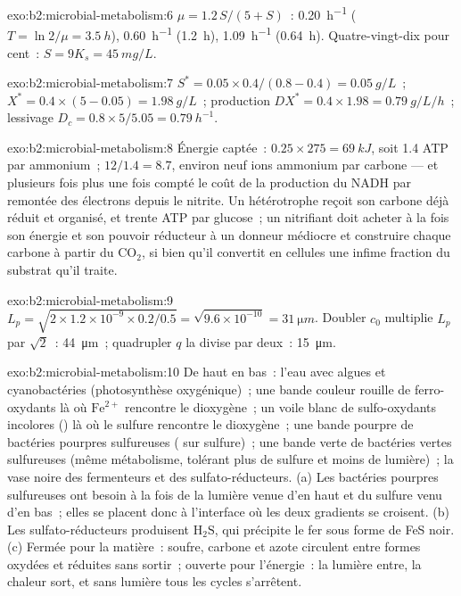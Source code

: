 \begin{solution}{exo:b2:microbial-metabolism:6}
$\mu = 1.2\,S/(5 + S)$~: \qty{0.20}{h^{-1}} ($T = \ln 2/\mu =
\qty{3.5}{h}$), \qty{0.60}{h^{-1}} (\qty{1.2}{h}), \qty{1.09}{h^{-1}}
(\qty{0.64}{h}). Quatre-vingt-dix pour cent~: $S = 9K_s = \qty{45}{mg/L}$.
\end{solution}

\begin{solution}{exo:b2:microbial-metabolism:7}
$S^* = 0.05\times 0.4/(0.8 - 0.4) = \qty{0.05}{g/L}$~; $X^* =
0.4\times(5 - 0.05) = \qty{1.98}{g/L}$~; production $DX^* = 0.4\times
1.98 = \qty{0.79}{g/L/h}$~; lessivage $D_c = 0.8\times 5/5.05 =
\qty{0.79}{h^{-1}}$.
\end{solution}

\begin{solution}{exo:b2:microbial-metabolism:8}
Énergie captée~: $0.25\times 275 = \qty{69}{kJ}$, soit 1.4 ATP par
ammonium~; $12/1.4 = 8.7$, environ neuf ions ammonium par carbone ---
et plusieurs fois plus une fois compté le coût de la production du NADH
par remontée des électrons depuis le nitrite. Un hétérotrophe reçoit son
carbone déjà réduit et organisé, et trente ATP par glucose~; un
nitrifiant doit acheter à la fois son énergie et son pouvoir réducteur à
un donneur médiocre et construire chaque carbone à partir du
$\mathrm{CO_2}$, si bien qu'il convertit en cellules une infime fraction
du substrat qu'il traite.
\end{solution}

\begin{solution}{exo:b2:microbial-metabolism:9}
$L_p = \sqrt{2\times 1.2\times 10^{-9}\times 0.2/0.5} =
\sqrt{9.6\times 10^{-10}} = \qty{31}{\micro m}$. Doubler $c_0$
multiplie $L_p$ par $\sqrt 2$~: \qty{44}{\micro m}~; quadrupler $q$ la
divise par deux~: \qty{15}{\micro m}.
\end{solution}

\begin{solution}{exo:b2:microbial-metabolism:10}
De haut en bas~: l'eau avec algues et cyanobactéries (photosynthèse
oxygénique)~; une bande couleur rouille de ferro-oxydants là où
$\mathrm{Fe^{2+}}$ rencontre le dioxygène~; un voile blanc de
sulfo-oxydants incolores () là où le sulfure rencontre
le dioxygène~; une bande pourpre de bactéries pourpres sulfureuses
( sur sulfure)~; une bande verte de bactéries
vertes sulfureuses (même métabolisme, tolérant plus de sulfure et moins
de lumière)~; la vase noire des fermenteurs et des sulfato-réducteurs.
(a) Les bactéries pourpres sulfureuses ont besoin à la fois de la
lumière venue d'en haut et du sulfure venu d'en bas~; elles se placent
donc à l'interface où les deux gradients se croisent. (b) Les
sulfato-réducteurs produisent $\mathrm{H_2S}$, qui précipite le fer sous
forme de FeS noir. (c) Fermée pour la matière~: soufre, carbone et azote
circulent entre formes oxydées et réduites sans sortir~; ouverte pour
l'énergie~: la lumière entre, la chaleur sort, et sans lumière tous les
cycles s'arrêtent.
\end{solution}

